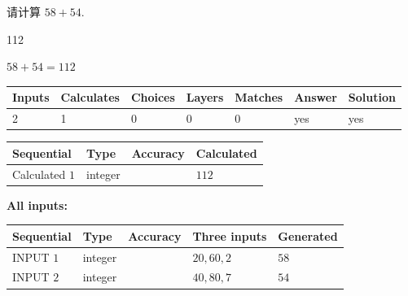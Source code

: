 \documentclass{ctexart}
\begin{document}
  
 
请计算 $ %
58 +  %
54 $.
 
 
 
\noindent{}
 
 

112
 
 
\noindent{}
 
 

 
 
 
\noindent{}
 
 

$ %
58 +  %
54=   %
112$
 
 
\noindent{}
 
 

 
   
   
   
   
\noindent\begin{tabular}{|l|l|l|l|l|l|l|}
 \hline
Inputs & Calculates & Choices & Layers & Matches & Answer & Solution \\ \hline
 2  & 
 1  & 
 0
  & 
 0  & 
 0  & 
  yes & 
  yes 
  \\ \hline
 \end{tabular}
   
   
   
   
\noindent{}
   
   
  
  
\noindent\begin{tabular}{|l|l|l|l|}
\hline
 Sequential & Type & Accuracy & Calculated \\ 
\hline
 
 
  Calculated $  1 $ & integer &  & 
  $ 112 $ 
 \\  \hline  
 \end{tabular}
   
   
   
   
\noindent\vspace{0.1in}\hspace{-0.08in} {\textbf{\Large{All inputs: }}}
   
   
  
  
\noindent\begin{tabular}{|l|l|l|l|l|}
\hline
 Sequential & Type & Accuracy & Three inputs & Generated \\ 
\hline
 
 
  INPUT $  1 $ & integer &  & $
 20
 , 
 60
 , 
 2
 $ & $ 58 $ 
 \\  \hline  
 
 
  INPUT $  2 $ & integer &  & $
 40
 , 
 80
 , 
 7
 $ & $ 54 $ 
 \\  \hline  
 \end{tabular}
   
\end{document}
